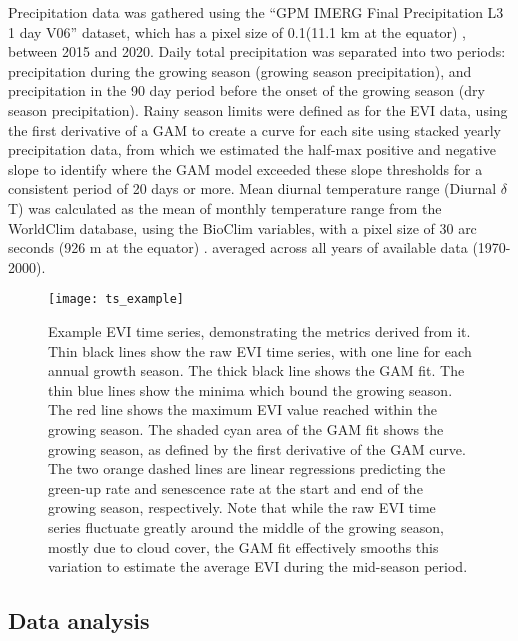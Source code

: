 \documentclass[11pt,a4paper]{article}
\begin{document}
Precipitation data was gathered using the ``GPM IMERG Final Precipitation L3 1 day V06'' dataset, which has a pixel size of 0.1\textdegree (11.1 km at the equator) \citep{GPM}, between 2015 and 2020. Daily total precipitation was separated into two periods: precipitation during the growing season (growing season precipitation), and precipitation in the 90 day period before the onset of the growing season (dry season precipitation). Rainy season limits were defined as for the EVI data, using the first derivative of a GAM to create a curve for each site using stacked yearly precipitation data, from which we estimated the half-max positive and negative slope to identify where the GAM model exceeded these slope thresholds for a consistent period of 20 days or more. Mean diurnal temperature range (Diurnal $\delta$T) was calculated as the mean of monthly temperature range from the WorldClim database, using the BioClim variables, with a pixel size of 30 arc seconds (926 m at the equator) \citep{Fick2017}. averaged across all years of available data (1970-2000).

\begin{figure}[H]
\centering
	\texttt{[image: ts\_example]}
	\caption{Example EVI time series, demonstrating the metrics derived from it. Thin black lines show the raw EVI time series, with one line for each annual growth season. The thick black line shows the GAM fit. The thin blue lines show the minima which bound the growing season. The red line shows the maximum EVI value reached within the growing season. The shaded cyan area of the GAM fit shows the growing season, as defined by the first derivative of the GAM curve. The two orange dashed lines are linear regressions predicting the green-up rate and senescence rate at the start and end of the growing season, respectively. Note that while the raw EVI time series fluctuate greatly around the middle of the growing season, mostly due to cloud cover, the GAM fit effectively smooths this variation to estimate the average EVI during the mid-season period.}
	\label{ts_example}
\end{figure}

\subsection{Data analysis}
\end{document}
